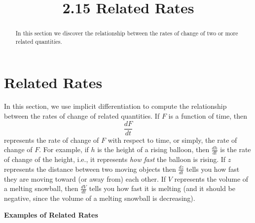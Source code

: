 \documentclass{ximera}
\title{2.15 Related Rates}
\begin{document}
\begin{abstract}
In this section we discover the relationship between the rates of change of two or more related quantities.
\end{abstract}

\maketitle


\section{Related Rates}

In this section, we use implicit differentiation to compute the relationship between 
the rates of change of related quantities.
If $F$ is a function of time, then 
\[ \frac{dF}{dt} \]
represents the rate of change of $F$ with respect to time, or simply, the rate of change of $F$.
For example, if $h$ is the height of a rising balloon, then $\frac{dh}{dt}$
is the rate of change of the height, i.e., it represents \textit{how fast}
the balloon is rising. If $z$ represents the distance between two moving 
objects then $\frac{dz}{dt}$ tells you how fast they are moving toward 
(or away from) each other.  If $V$ represents the volume of a melting snowball, 
then $\frac{dV}{dt}$ tells you how fast it is melting (and it should be negative, 
since the volume of a melting snowball is decreasing).


\begin{center}
\bf{Examples of Related Rates}
\end{center}
\end{document}
